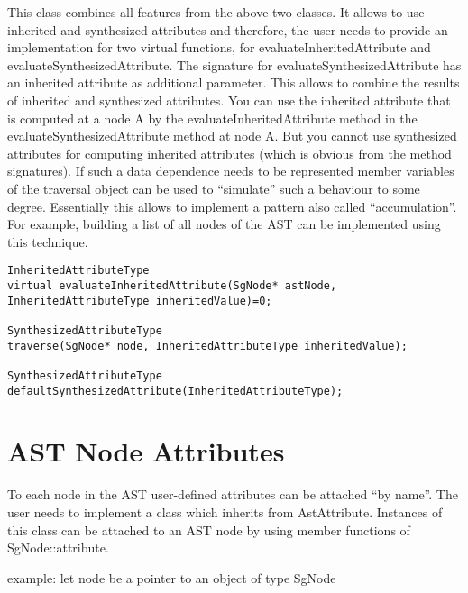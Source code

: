 This class combines all features from the above two classes.  It allows to
use inherited and synthesized attributes and therefore, the user needs
to provide an implementation for two virtual functions, for
evaluateInheritedAttribute and evaluateSynthesizedAttribute. The
signature for evaluateSynthesizedAttribute has an inherited attribute
as additional parameter. This allows to combine the results of
inherited and synthesized attributes. You can use the
inherited attribute that is computed at a
node A by the evaluateInheritedAttribute method in the evaluateSynthesizedAttribute method at node A. But you cannot
use synthesized attributes for computing inherited attributes (which is obvious from the method signatures). If such a data
dependence needs to be represented member variables of the traversal
object can be used to ``simulate'' such a behaviour to some
degree. Essentially this allows to implement a pattern also called
``accumulation''. For example, building a list of all nodes of the AST
can be implemented using this technique.


\begin{verbatim}
InheritedAttributeType 
virtual evaluateInheritedAttribute(SgNode* astNode, InheritedAttributeType inheritedValue)=0;

SynthesizedAttributeType 
traverse(SgNode* node, InheritedAttributeType inheritedValue);

SynthesizedAttributeType 
defaultSynthesizedAttribute(InheritedAttributeType);
\end{verbatim}

\section{AST Node Attributes}

To each node in the AST user-defined attributes can be attached ``by name''. The
user needs to implement a class which inherits from
AstAttribute. Instances of this class can be attached to an AST node by using member functions of SgNode::attribute.

example: let node be a pointer to an object of type SgNode

